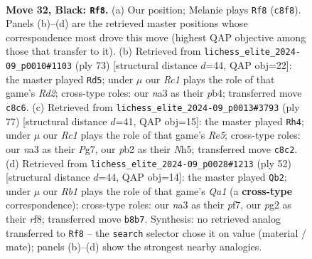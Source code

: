 \documentclass[11pt]{article}
\begin{document}
\clearpage

\begin{figure}[p]\centering
\begin{subfigure}{0.46\textwidth}\centering
\resizebox{\linewidth}{!}{%
\newchessgame
\chessboard[
  setfen={1rr5/6kp/1p2Q3/p7/7P/N7/PP3PP1/R5K1 b - - 2 32},
  showmover=false,
  pgfstyle=straightmove, color=movearrow, markmove={c8-f8}
]}
\caption{}
\end{subfigure}\hfill
\begin{subfigure}{0.46\textwidth}\centering
\resizebox{\linewidth}{!}{%
\newchessgame
\chessboard[
  setfen={3r4/1k1r2p1/1p5p/5Q2/PP6/6P1/5P1P/6K1 b - - 0 37},
  showmover=false,
  pgfstyle=straightmove, color=movearrow, markmove={d7-d5}
]}
\caption{}
\end{subfigure}
\\[4pt]
\begin{subfigure}{0.46\textwidth}\centering
\resizebox{\linewidth}{!}{%
\newchessgame
\chessboard[
  setfen={4r2k/p5p1/8/3Q2Pn/4r3/1P6/P6P/5R1K b - - 4 39},
  showmover=false,
  pgfstyle=straightmove, color=movearrow, markmove={e4-h4}
]}
\caption{}
\end{subfigure}\hfill
\begin{subfigure}{0.46\textwidth}\centering
\resizebox{\linewidth}{!}{%
\newchessgame
\chessboard[
  setfen={5rk1/5ppp/8/8/1P1p4/7P/2q2PP1/QR4K1 w - - 0 27},
  showmover=false,
  pgfstyle=straightmove, color=movearrow, markmove={a1-b2}
]}
\caption{}
\end{subfigure}
\caption{\textbf{Move 32, Black: \texttt{Rf8}.} (a) Our position; Melanie plays \texttt{Rf8} (\texttt{c8f8}). Panels (b)--(d) are the retrieved master positions whose correspondence most drove this move (highest QAP objective among those that transfer to it). (b) Retrieved from \texttt{lichess\_elite\_2024-09\_p0010\#1103} (ply 73) [structural distance $d$=44, QAP obj=22]: the master played \texttt{Rd5}; under $\mu$ our \emph{Rc1} plays the role of that game's \emph{Rd2}; cross-type roles: our \emph{n}a3 as their \emph{p}b4; transferred move \texttt{c8c6}. (c) Retrieved from \texttt{lichess\_elite\_2024-09\_p0013\#3793} (ply 77) [structural distance $d$=41, QAP obj=15]: the master played \texttt{Rh4}; under $\mu$ our \emph{Rc1} plays the role of that game's \emph{Re5}; cross-type roles: our \emph{n}a3 as their \emph{P}g7, our \emph{p}b2 as their \emph{N}h5; transferred move \texttt{c8c2}. (d) Retrieved from \texttt{lichess\_elite\_2024-09\_p0028\#1213} (ply 52) [structural distance $d$=44, QAP obj=14]: the master played \texttt{Qb2}; under $\mu$ our \emph{Rb1} plays the role of that game's \emph{Qa1} (a \textbf{cross-type} correspondence); cross-type roles: our \emph{n}a3 as their \emph{p}f7, our \emph{p}g2 as their \emph{r}f8; transferred move \texttt{b8b7}. Synthesis: no retrieved analog transferred to \texttt{Rf8} -- the \texttt{search} selector chose it on value (material / mate); panels (b)--(d) show the strongest nearby analogies.}
\label{fig:thought-m63}
\end{figure}
\end{document}
